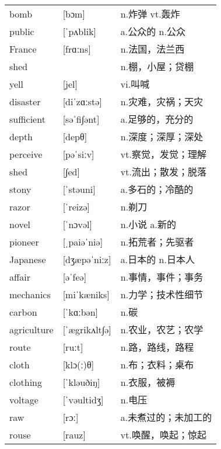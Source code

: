 \documentclass[a4paper]{article}
\begin{document}
\section{}
\begin{tabular}{l l l}

bomb & [bɔm] & n.炸弹 vt.轰炸 \\
public & [ˈpʌblik] & a.公众的 n.公众 \\
France & [frɑːns] & n.法国，法兰西 \\
shed &  & n.棚，小屋；贷棚 \\
yell & [jel] & vi.叫喊 \\
disaster & [diˈzɑːstə] & n.灾难，灾祸；天灾 \\
sufficient & [səˈfi∫ənt] & a.足够的，充分的 \\
depth & [depθ] & n.深度；深厚；深处 \\
perceive & [pəˈsiːv] & vt.察觉，发觉；理解 \\
shed & [∫ed] & vt.流出；散发；脱落 \\
stony & [ˈstəuni] & a.多石的；冷酷的 \\
razor & [ˈreizə] & n.剃刀 \\
novel & [ˈnɔvəl] & n.小说 a.新的 \\
pioneer & [ˌpaiəˈniə] & n.拓荒者；先驱者 \\
Japanese & [dʒæpəˈniːz] & a.日本的 n.日本人 \\
affair & [əˈfeə] & n.事情，事件；事务 \\
mechanics & [miˈkæniks] & n.力学；技术性细节 \\
carbon & [ˈkɑːbən] & n.碳 \\
agriculture & [ˈægrikʌlt∫ə] & n.农业，农艺；农学 \\
route & [ruːt] & n.路，路线，路程 \\
cloth & [klɔ(ː)θ] & n.布；衣料；桌布 \\
clothing & [ˈkləuðiŋ] & n.衣服，被褥 \\
voltage & [ˈvəultidʒ] & n.电压 \\
raw & [rɔː] & a.未煮过的；未加工的 \\
rouse & [rauz] & vt.唤醒，唤起；惊起 \\

\end{tabular}
\end{document}
